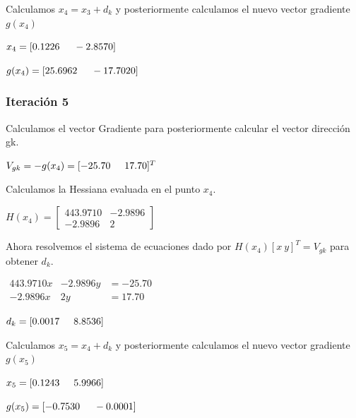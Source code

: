 \documentclass[12pt]{article}
\begin{document}
	Calculamos $x_4=x_3+d_k$ y posteriormente calculamos el nuevo vector gradiente $g(x_4)$
	
	\begin{center}
		$x_4=[0.1226\hspace{0.5cm}-2.8570]$
		
		$g(x_4)=[25.6962\hspace{0.5cm}-17.7020]$
	\end{center}


    \subsubsection*{Iteración 5}
	
	Calculamos el vector Gradiente para posteriormente calcular el vector dirección gk.
	
	\begin{center}
		$V_{gk}=-g(x_4)=[-25.70 \hspace{0.5cm}17.70]^T$			
	\end{center}
	
	Calculamos la Hessiana evaluada en el punto $x_4$.
	
	\begin{center}
		$H(x_4)=\left[\begin{array}{cc}
			443.9710   &  -2.9896\\
			-2.9896   & 2
		\end{array}\right]$		
	\end{center}
	
	Ahora resolvemos el sistema de ecuaciones dado por $H(x_4)[x\ y]^T=V_{gk}$ para obtener $d_k$.
	
	\begin{center}
		$\begin{array}{ccc}
			443.9710x &-2.9896y & =-25.70\\
			-2.9896x & 2y & =17.70
		\end{array}$
		
		$d_k=[0.0017\hspace{0.5cm}8.8536]$
	\end{center}	
	
	Calculamos $x_5=x_4+d_k$ y posteriormente calculamos el nuevo vector gradiente $g(x_5)$
	
	\begin{center}
		$x_5=[0.1243\hspace{0.5cm} 5.9966]$
		
		$g(x_5)=[-0.7530 \hspace{0.5cm}-0.0001]$
	\end{center}
	
\end{document}
